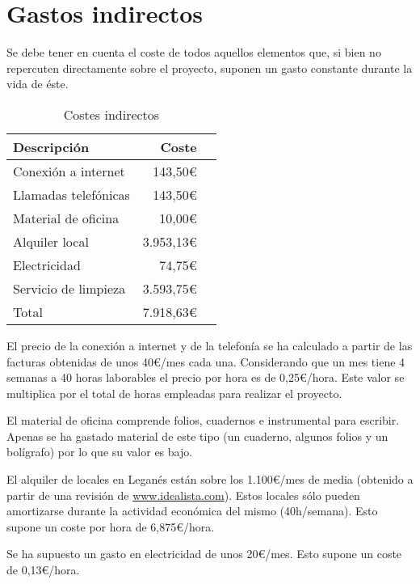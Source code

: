 \section{Gastos indirectos}

Se debe tener en cuenta el coste de todos aquellos elementos que, si bien no repercuten directamente sobre el proyecto, suponen un gasto constante durante la vida de éste.

\begin{table}
	\centering
	
	\begin{tabular}{|l|r|r|}
		\hline
		Descripción & Coste \\
		\hline
		Conexión a internet & 143,50\euro \\
		\hline
		Llamadas telefónicas & 143,50\euro \\
		\hline
		Material de oficina & 10,00\euro\\
		\hline
		Alquiler local & 3.953,13\euro\\
		\hline
		Electricidad & 74,75\euro\\
		\hline
		Servicio de limpieza & 3.593,75\euro\\
		
		\hline
		\hline
		Total & 7.918,63\euro\\
		\hline
	\end{tabular}
	\caption{Costes indirectos}\label{tab:cost_indi}
\end{table}

El precio de la conexión a internet y de la telefonía se ha calculado a partir de las facturas obtenidas de unos 40\euro/mes cada una. Considerando que un mes tiene 4 semanas a 40 horas laborables el precio por hora es de 0,25\euro/hora. Este valor se multiplica por el total de horas empleadas para realizar el proyecto.

El material de oficina comprende folios, cuadernos e instrumental para escribir. Apenas se ha gastado material de este tipo (un cuaderno, algunos folios y un bolígrafo) por lo que su valor es bajo.

El alquiler de locales en Leganés están sobre los 1.100\euro/mes de media (obtenido a partir de una revisión de \url{www.idealista.com}). Estos locales sólo pueden amortizarse durante la actividad económica del mismo (40h/semana). Esto supone un coste por hora de 6,875\euro/hora.

Se ha supuesto un gasto en electricidad de unos 20\euro/mes. Esto supone un coste de 0,13\euro/hora.

